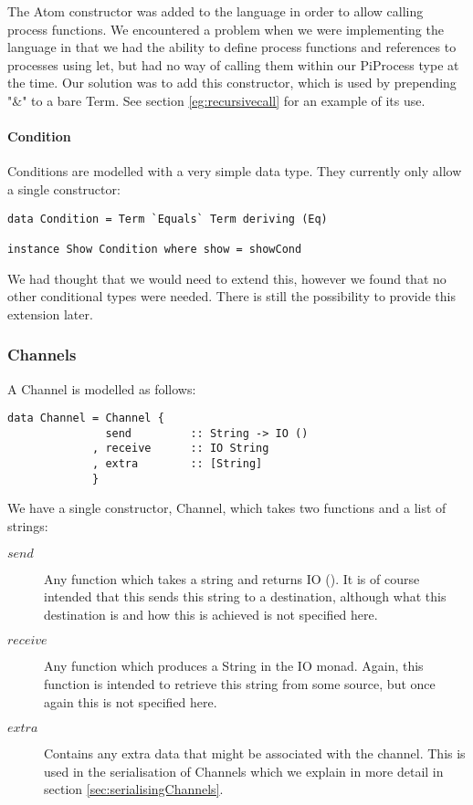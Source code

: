 The Atom constructor was added to the language in order to allow calling process functions. We encountered a problem when we were implementing the language in that we had the ability to define process functions and references to processes using let, but had no way of calling them within our PiProcess type at the time. Our solution was to add this constructor, which is used by prepending "\&" to a bare Term. See section \ref{eg:recursivecall} for an example of its use.
\paragraph{Condition}
\label{para:condition}

Conditions are modelled with a very simple data type. They currently only allow a single constructor:

\begin{verbatim}
data Condition = Term `Equals` Term deriving (Eq)

instance Show Condition where show = showCond
\end{verbatim}

We had thought that we would need to extend this, however we found that no other conditional types were needed. There is still the possibility to provide this extension later.

\subsubsection{Channels}

A Channel is modelled as follows:

\begin{verbatim}
data Channel = Channel {
               send         :: String -> IO ()
             , receive      :: IO String
             , extra        :: [String]
             }
\end{verbatim}

We have a single constructor, Channel, which takes two functions and a list of strings:
\begin{description}
    \item[$send$] Any function which takes a string and returns IO (). It is of course intended that this sends this string to a destination, although what this destination is and how this is achieved is not specified here.
    \item[$receive$] Any function which produces a String in the IO monad. Again, this function is intended to retrieve this string from some source, but once again this is not specified here.
    \item[$extra$] Contains any extra data that might be associated with the channel. This is used in the serialisation of Channels which we explain in more detail in section \ref{sec:serialisingChannels}.
\end{description}

